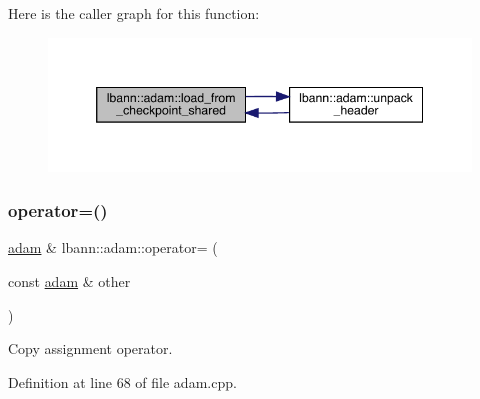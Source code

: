 Here is the caller graph for this function\+:\nopagebreak
\begin{figure}[H]
\begin{center}
\leavevmode
\includegraphics[width=346pt]{classlbann_1_1adam_aca07e925a4751fc5c10a62fb9c72c896_icgraph}
\end{center}
\end{figure}
\mbox{\label{classlbann_1_1adam_a00051b788b2bb34102a6bad5a380fc85}} 
\subsubsection{\texorpdfstring{operator=()}{operator=()}}
{\footnotesize\ttfamily \hyperlink{classlbann_1_1adam}{adam} \& lbann\+::adam\+::operator= (\begin{DoxyParamCaption}\item[{const \hyperlink{classlbann_1_1adam}{adam} \&}]{other }\end{DoxyParamCaption})}

Copy assignment operator. 

Definition at line 68 of file adam.\+cpp.


